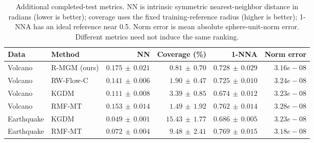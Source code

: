 \begin{table}[H]
\centering\small
\caption{Additional completed-test metrics. NN is intrinsic symmetric nearest-neighbor distance in radians (lower is better); coverage uses the fixed training-reference radius (higher is better); 1-NNA has an ideal reference near 0.5. Norm error is mean absolute sphere-unit-norm error. Different metrics need not induce the same ranking.}
\label{tab:recent-extra}
\begin{tabular}{@{}llrrrr@{}}
\toprule
Data & Method & NN & Coverage (\%) & 1-NNA & Norm error \\
\midrule
Volcano & R-MGM (ours) & $0.175\,\pm\,0.021$ & $0.81\,\pm\,0.70$ & $0.728\,\pm\,0.029$ & $3.16e-08$ \\
Volcano & RW-Flow-C & $0.141\,\pm\,0.006$ & $1.90\,\pm\,0.47$ & $0.725\,\pm\,0.010$ & $3.24e-08$ \\
Volcano & KGDM & $0.111\,\pm\,0.008$ & $3.39\,\pm\,0.85$ & $0.674\,\pm\,0.012$ & $3.23e-08$ \\
Volcano & RMF-MT & $0.153\,\pm\,0.014$ & $1.49\,\pm\,1.92$ & $0.762\,\pm\,0.014$ & $3.28e-08$ \\
Earthquake & KGDM & $0.049\,\pm\,0.001$ & $15.43\,\pm\,1.77$ & $0.686\,\pm\,0.005$ & $3.23e-08$ \\
Earthquake & RMF-MT & $0.072\,\pm\,0.004$ & $9.48\,\pm\,2.41$ & $0.769\,\pm\,0.015$ & $3.18e-08$ \\
\bottomrule
\end{tabular}
\end{table}
